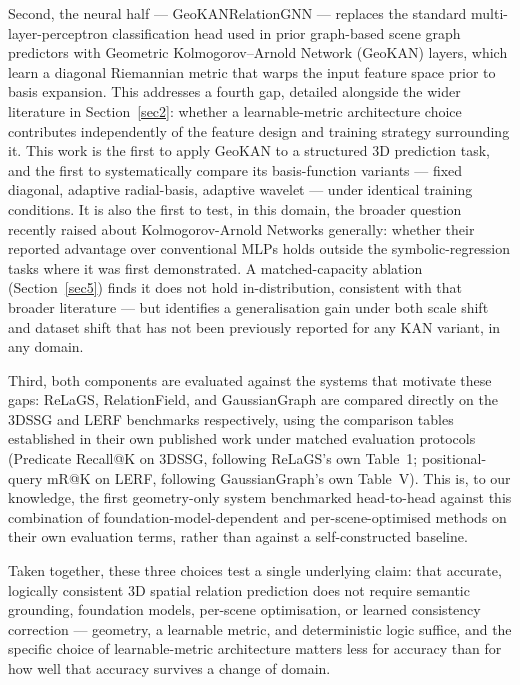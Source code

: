 \documentclass[sn-mathphys,Numbered]{sn-jnl}
\begin{document}
Second, the neural half --- GeoKANRelationGNN --- replaces the standard multi-layer-perceptron classification head used in prior graph-based scene graph predictors with Geometric Kolmogorov--Arnold Network (GeoKAN) layers, which learn a diagonal Riemannian metric that warps the input feature space prior to basis expansion. This addresses a fourth gap, detailed alongside the wider literature in Section~\ref{sec2}: whether a learnable-metric architecture choice contributes independently of the feature design and training strategy surrounding it. This work is the first to apply GeoKAN to a structured 3D prediction task, and the first to systematically compare its basis-function variants --- fixed diagonal, adaptive radial-basis, adaptive wavelet --- under identical training conditions. It is also the first to test, in this domain, the broader question recently raised about Kolmogorov-Arnold Networks generally: whether their reported advantage over conventional MLPs holds outside the symbolic-regression tasks where it was first demonstrated. A matched-capacity ablation (Section~\ref{sec5}) finds it does not hold in-distribution, consistent with that broader literature --- but identifies a generalisation gain under both scale shift and dataset shift that has not been previously reported for any KAN variant, in any domain.

Third, both components are evaluated against the systems that motivate these gaps: ReLaGS, RelationField, and GaussianGraph are compared directly on the 3DSSG and LERF benchmarks respectively, using the comparison tables established in their own published work under matched evaluation protocols (Predicate Recall@K on 3DSSG, following ReLaGS's own Table~1; positional-query mR@K on LERF, following GaussianGraph's own Table~V). This is, to our knowledge, the first geometry-only system benchmarked head-to-head against this combination of foundation-model-dependent and per-scene-optimised methods on their own evaluation terms, rather than against a self-constructed baseline.

Taken together, these three choices test a single underlying claim: that accurate, logically consistent 3D spatial relation prediction does not require semantic grounding, foundation models, per-scene optimisation, or learned consistency correction --- geometry, a learnable metric, and deterministic logic suffice, and the specific choice of learnable-metric architecture matters less for accuracy than for how well that accuracy survives a change of domain.
\end{document}
